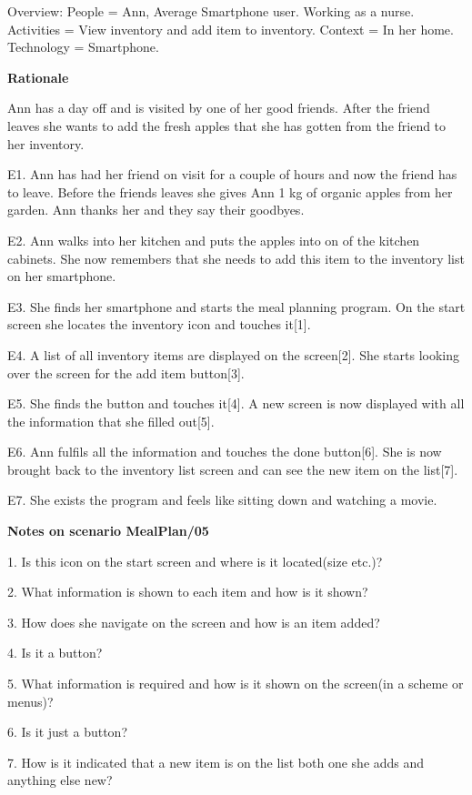 Overview:
	People = Ann, Average Smartphone user. Working as a nurse.
	Activities = View inventory and add item to inventory.
	Context = In her home.
	Technology = Smartphone.

\textbf{Rationale}

Ann has a day off and is visited by one of her good friends. After the friend leaves she wants to add the fresh apples that she has gotten from the friend to her inventory.

	E1. Ann has had her friend on visit for a couple of hours and now the friend has to leave. Before the friends leaves she gives Ann 1 kg of organic apples from her garden. Ann thanks her and they say their goodbyes.

	E2. Ann walks into her kitchen and puts the apples into on of the kitchen cabinets. She now remembers that she needs to add this item to the inventory list on her smartphone.

	E3. She finds her smartphone and starts the meal planning program. On the start screen she locates the inventory icon and touches it[1].

	E4. A list of all inventory items are displayed on the screen[2]. She starts looking over the screen for the add item button[3].

	E5. She finds the button and touches it[4]. A new screen is now displayed with all the information that she filled out[5]. 

	E6. Ann fulfils all the information and touches the done button[6]. She is now brought back to the inventory list screen and can see the new item on the list[7].

	E7. She exists the program and feels like sitting down and watching a movie.

\textbf{Notes on scenario MealPlan/05}

1. Is this icon on the start screen and where is it located(size etc.)?

2. What information is shown to each item and how is it shown?

3. How does she navigate on the screen and how is an item added?

4. Is it a button?

5. What information is required and how is it shown on the screen(in a scheme or menus)?

6. Is it just a button?

7. How is it indicated that a new item is on the list both one she adds and anything else new?

